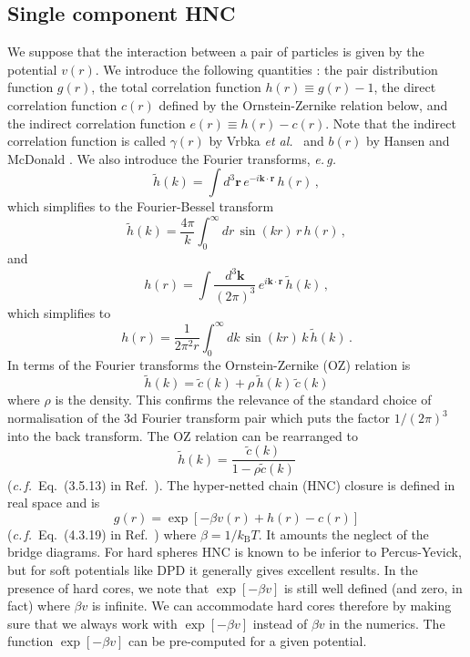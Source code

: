 \documentclass[12pt,a4paper]{article}
\newcommand{\latin}[1]{\emph{#1}}
\newcommand{\etal}{\latin{et al.}}
\newcommand{\eg}{\latin{e.\,g.}}
\newcommand{\cf}{\latin{c.\,f.}}
\newcommand{\kB}{k_{\mathrm{B}}}
\newcommand{\kT}{\kB T}
\newcommand{\myvec}[1]{{\mathbf #1}}
\newcommand{\rvec}{\myvec{r}}
\newcommand{\kvec}{\myvec{k}}
\newcommand{\Refcite}[1]{Ref.~\cite{#1}}
\begin{document}
\subsection{Single component HNC}
%
We suppose that the interaction between a pair of particles is given
by the potential $v(r)$.  We introduce the following quantities
\cite{HM06}: the pair distribution function $g(r)$, the total
correlation function $h(r)\equiv g(r)-1$, the direct correlation
function $c(r)$ defined by the Ornstein-Zernike relation below, and
the indirect correlation function $e(r)\equiv h(r)-c(r)$.  Note that
the indirect correlation function is called $\gamma(r)$ by Vrbka
\etal\ \cite{Vrbka09} and $b(r)$ by Hansen and McDonald \cite{HM06}.  We
also introduce the Fourier transforms, \eg\
%
\begin{equation}
\tilde h(k) = \int\!d^3\rvec\, e^{-i\kvec\cdot\rvec} \,h(r)\,,
\end{equation}
%
which simplifies to the Fourier-Bessel transform
%
\begin{equation}
\tilde h(k) = \frac{4\pi}{k} \int_0^\infty \!\! dr\, \sin(kr)\, r\, h(r)\,,
\label{eq:fFB}
\end{equation}
%
and
%
\begin{equation}
h(r) = \int\! \frac{d^3\kvec}{(2\pi)^3} \,e^{i\kvec\cdot\rvec} \,\tilde h(k)\,,\label{eq:ftinv}
\end{equation}
%
which simplifies to 
%
\begin{equation}
h(r) = \frac{1}{2 \pi^2 r} \int_0^\infty \!\!dk\, \sin(kr)\, k\, \tilde h(k)\,.
\label{eq:bFB}
\end{equation}
%
In terms of the Fourier transforms the Ornstein-Zernike (OZ) relation
is
%
\begin{equation}
\tilde h(k) = \tilde c(k) + \rho\,
\tilde h(k)\, \tilde c(k)
\label{eq:oz1a}
\end{equation}
%
where $\rho$ is the density.  This confirms the relevance of the
standard choice of normalisation of the 3d Fourier transform pair
which puts the factor $1/(2\pi)^3$ into the back transform.  The OZ
relation can be rearranged to 
%
\begin{equation}
\tilde h(k) = \frac{\tilde c(k)}{1-\rho \tilde c(k)}
\label{eq:oz1b}
\end{equation}
%
(\cf\ Eq.~(3.5.13) in \Refcite{HM06}).
The hyper-netted chain (HNC) closure is defined in real space and is
%
\begin{equation}
g(r)=\exp[-\beta v(r)+h(r)-c(r)]
\label{eq:hnc1a}
\end{equation}
%
(\cf\ Eq.~(4.3.19) in \Refcite{HM06}) where $\beta=1/\kT$.  It
amounts the neglect of the bridge diagrams.  For hard spheres HNC is
known to be inferior to Percus-Yevick, but for soft potentials like
DPD it generally gives excellent results.  In the presence of hard
cores, we note that $\exp[-\beta v]$ is still well defined (and zero,
in fact) where $\beta v$ is infinite.  We can accommodate hard cores
therefore by making sure that we always work with $\exp[-\beta v]$
instead of $\beta v$ in the numerics.  The function $\exp[-\beta v]$
can be pre-computed for a given potential.
\end{document}
